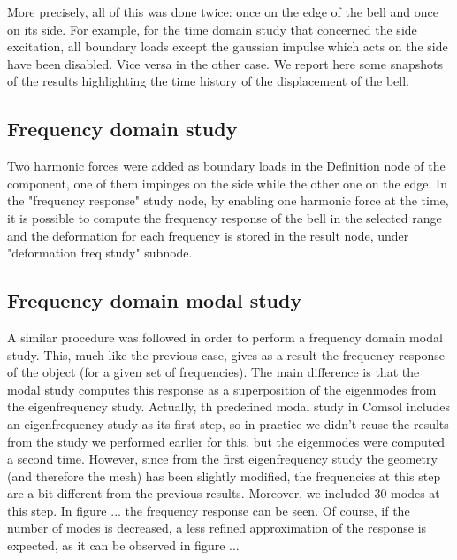 \documentclass[a4paper]{article}
\begin{document}
More precisely, all of this was done twice: once on the edge of the bell and once on its side. For example, for the time domain study that concerned the side excitation, all boundary loads except the gaussian impulse which acts on the side have been disabled. Vice versa in the other case. We report here some snapshots of the results highlighting the time history of the displacement of the bell. 

\subsection{Frequency domain study}
Two harmonic forces were added as boundary loads in the Definition node of the component, one of them impinges on the side while the other one on the edge. In the "frequency response" study node, by enabling one harmonic force at the time, it is possible to compute the frequency response of the bell in the selected range and the deformation for each frequency is stored in the result node, under "deformation freq study" subnode. 

\subsection{Frequency domain modal study}
A similar procedure was followed in order to perform a frequency domain modal study. This, much like the previous case, gives as a result the frequency response of the object (for a given set of frequencies). The main difference is that the modal study computes this response as a superposition of the eigenmodes from the eigenfrequency study. Actually, th predefined modal study in Comsol includes an eigenfrequency study as its first step, so in practice we didn't reuse the results from the study we performed earlier for this, but the eigenmodes were computed a second time. However, since from the first eigenfrequency study the geometry (and therefore the mesh) has been slightly modified, the frequencies at this step are a bit different from the previous results. Moreover, we included 30 modes at this step. In figure ... the frequency response can be seen. Of course, if the number of modes is decreased, a less refined approximation of the response is expected, as it can be observed in figure ... 
\end{document}
